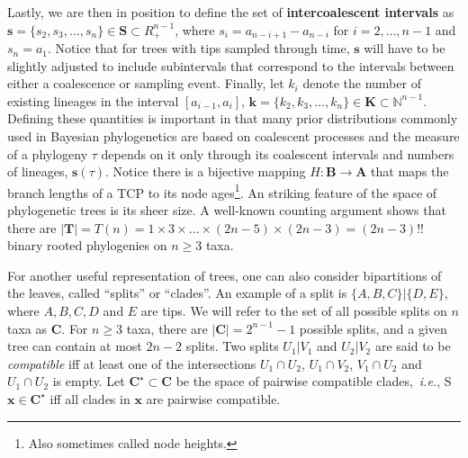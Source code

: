 Lastly, we are then in position to define the set of \textbf{intercoalescent intervals} as $\boldsymbol s = \{s_2, s_3, \ldots, s_n\} \in \boldsymbol S \subset {R}_+^{n-1}$, where $s_i = a_{n-i+1}-a_{n-i}$ for $i = 2, \ldots, n-1$ and $s_n = a_1$.
Notice that for trees with tips sampled through time, $\boldsymbol s$ will have to be slightly adjusted to include subintervals that correspond to the intervals between either a coalescence or sampling event.
Finally, let $k_i$ denote the number of existing lineages in the interval $[a_{i-1}, a_i]$, $\boldsymbol k = \{k_2, k_3, \ldots, k_n\} \in \boldsymbol K \subset \mathbb{N}^{n-1}$.
Defining these quantities is important in that many prior distributions commonly used in Bayesian phylogenetics are based on coalescent processes and the measure of a phylogeny $\tau$ depends on it only through its coalescent intervals and numbers of lineages, $\boldsymbol s(\tau)$.
Notice there is a bijective mapping $H: \boldsymbol B \rightarrow \boldsymbol A$ that maps the branch lengths of a TCP to its node ages\footnote{Also sometimes called node heights.}.
An striking feature of the space of phylogenetic trees is its sheer size.
A well-known counting argument shows that there are $ |\boldsymbol T| = T(n) = 1 \times 3 \times \ldots \times (2n-5) \times (2n-3) = (2n-3)!!$ binary rooted phylogenies on $n \geq 3$ taxa.

For another useful representation of trees, one can also consider bipartitions of the leaves, called ``splits'' or ``clades''.%
An example of a split is $\{A, B, C\} | \{ D, E\}$, where $A, B, C, D$ and $E$ are tips.
We will refer to the set of all possible splits on $n$ taxa as $\boldsymbol C$.
For $n \geq 3$ taxa, there are $|\boldsymbol C| = 2^{n-1}-1$ possible splits, and a given tree can contain at most $2n-2$ splits.
Two splits $U_1 | V_1$ and $U_2 | V_2$ are said to be \textit{compatible} iff at least one of the intersections $U_1 \cap U_2$, $U_1 \cap V_2$, $V_1 \cap U_2$ and $U_1 \cap U_2$ is empty.
Let $\boldsymbol C^\star \subset \boldsymbol C$ be  the space of pairwise compatible clades,~\textit{i.e.}, S $\boldsymbol x \in \boldsymbol C^\star$ iff all clades in $\boldsymbol x$ are pairwise compatible.


